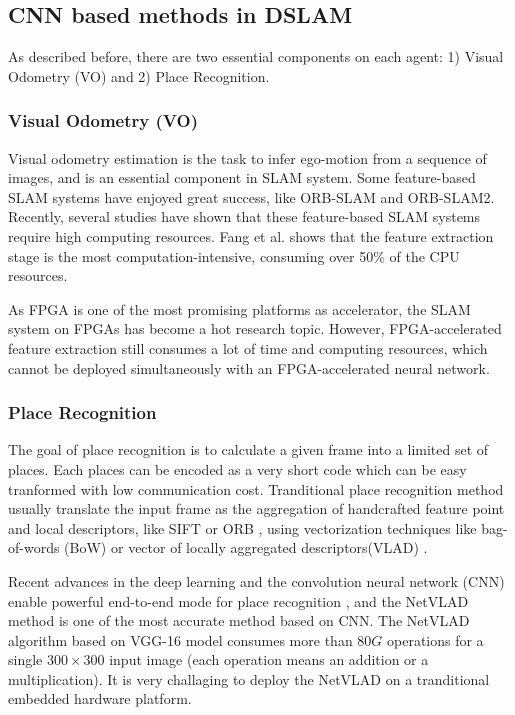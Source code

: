 \label{sec:background}
\subsection{CNN based methods in DSLAM}
As described before, there are two essential components on each agent: 1) Visual Odometry (VO) and 2) Place Recognition.

\subsubsection{Visual Odometry (VO)}

Visual odometry estimation is the task to infer ego-motion from a sequence of images, and is an essential component in SLAM system. Some feature-based SLAM systems have enjoyed great success, like ORB-SLAM\cite{DBLP:journals/trob/Mur-ArtalMT15} and ORB-SLAM2\cite{Mur-Artal:2017281}. Recently, several studies have shown that these feature-based SLAM systems require high computing resources. Fang et al.\cite{Fang2017FPGAbasedOF} shows that the feature extraction stage is the most computation-intensive, consuming over 50\% of the CPU resources.

As FPGA is one of the most promising platforms as accelerator, the SLAM system on FPGAs has become a hot research topic. However, FPGA-accelerated feature extraction still consumes a lot of time and computing resources, which cannot be deployed simultaneously with an FPGA-accelerated neural network.

\subsubsection{Place Recognition}

The goal of place recognition is to calculate a given frame into a limited set of places. Each places can be encoded as a very short code which can be easy tranformed with low communication cost. Tranditional place recognition method usually translate the input frame as the aggregation of handcrafted feature point and local descriptors, like SIFT \cite{Lowe:2004e6e} or ORB \cite{Mur-Artal:2017281}, using vectorization techniques like bag-of-words (BoW) \cite{Galvez-Lopez:2012c94} or vector of locally aggregated descriptors(VLAD) \cite{Jegou:2010f45}.

Recent advances in the deep learning and the convolution neural network (CNN) enable powerful end-to-end mode for place recognition \cite{Noh:2017d0b,Arandjelovic:2017997}, and the NetVLAD method is one of the most accurate method based on CNN. The NetVLAD algorithm based on VGG-16 model \cite{Simonyan:20143be} consumes more than $80G$ operations for a single $300 \times 300$ input image (each operation means an addition or a multiplication). It is very challaging to deploy the NetVLAD on a tranditional embedded hardware platform.

